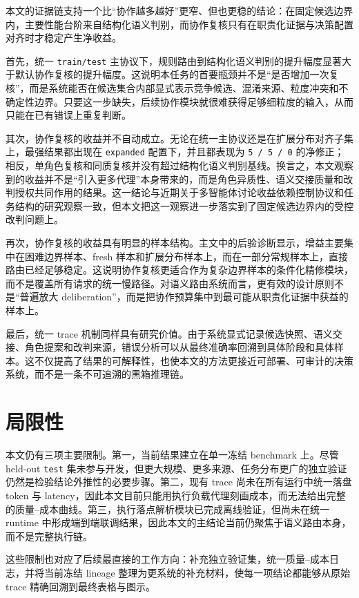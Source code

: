\documentclass[11pt,a4paper]{ctexart}
\begin{document}
本文的证据链支持一个比“协作越多越好”更窄、但也更稳的结论：在固定候选边界内，主要性能台阶来自结构化语义判别，而协作复核只有在职责化证据与决策配置对齐时才稳定产生净收益。

首先，统一 \texttt{train/test} 主协议下，规则路由到结构化语义判别的提升幅度显著大于默认协作复核的提升幅度。这说明本任务的首要瓶颈并不是“是否增加一次复核”，而是系统能否在候选集合内部显式表示竞争候选、混淆来源、粒度冲突和不确定性边界。只要这一步缺失，后续协作模块就很难获得足够细粒度的输入，从而只能在已有错误上重复判断。

其次，协作复核的收益并不自动成立。无论在统一主协议还是在扩展分布对齐子集上，最强结果都出现在 \texttt{expanded} 配置下，并且都表现为 \texttt{5 / 5 / 0} 的净修正；相反，单角色复核和同质复核并没有超过结构化语义判别基线。换言之，本文观察到的收益并不是“引入更多代理”本身带来的，而是角色异质性、语义交接质量和改判授权共同作用的结果。这一结论与近期关于多智能体讨论收益依赖控制协议和任务结构的研究观察一致\cite{bounds}，但本文把这一观察进一步落实到了固定候选边界内的受控改判问题上。

再次，协作复核的收益具有明显的样本结构。主文中的后验诊断显示，增益主要集中在困难边界样本、fresh 样本和扩展分布样本上，而在一部分常规样本上，直接路由已经足够稳定。这说明协作复核更适合作为复杂边界样本的条件化精修模块，而不是覆盖所有请求的统一慢路径。对语义路由系统而言，更有效的设计原则不是“普遍放大 deliberation”，而是把协作预算集中到最可能从职责化证据中获益的样本上。

最后，统一 trace 机制同样具有研究价值。由于系统显式记录候选快照、语义交接、角色提案和改判来源，错误分析可以从最终准确率回溯到具体阶段和具体样本。这不仅提高了结果的可解释性，也使本文的方法更接近可部署、可审计的决策系统，而不是一条不可追溯的黑箱推理链。

\section{局限性}

本文仍有三项主要限制。第一，当前结果建立在单一冻结 benchmark 上。尽管 held-out \texttt{test} 集未参与开发，但更大规模、更多来源、任务分布更广的独立验证仍然是检验结论外推性的必要步骤。第二，现有 trace 尚未在所有运行中统一落盘 token 与 latency，因此本文目前只能用执行负载代理刻画成本，而无法给出完整的质量--成本曲线。第三，执行落点解析模块已完成离线验证，但尚未在统一 runtime 中形成端到端联调结果，因此本文的主结论当前仍聚焦于语义路由本身，而不是完整执行链。

这些限制也对应了后续最直接的工作方向：补充独立验证集，统一质量--成本日志，并将当前冻结 lineage 整理为更系统的补充材料，使每一项结论都能够从原始 trace 精确回溯到最终表格与图示。
\end{document}
